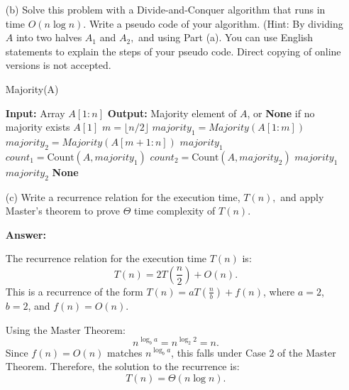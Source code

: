\documentclass[12pt]{article}
\begin{document}
\begin{itemize}
\begin{proof}
\end{proof}

\newpage
\item[(b)]  Solve this problem with a Divide-and-Conquer algorithm that runs in time $O(n \log n). $ Write a pseudo code of your algorithm.   (Hint: By dividing $A$ into two halves $A_1$ and $A_2,$ and using Part (a). You can use English statements to explain the steps of your pseudo code. Direct copying of online versions is not accepted.

\begin{algorithm}
\caption{Majority(A)}
\begin{algorithmic}[1]
\State \textbf{Input:} Array $A[1 : n]$
\State \textbf{Output:} Majority element of $A$, or \textbf{None} if no majority exists
\State
{} 
    \State \Return $A[1]$ 
\EndIf
\State
\State $m = \lfloor n/2 \rfloor$ 
\State $majority_1 = Majority(A[1 : m])$ 
\State $majority_2 = Majority(A[m+1 : n])$ 
\State
{} 
    \State \Return $majority_1$ 
\EndIf
\State
\State $count_1 = \text{Count}(A, majority_1)$ 
\State $count_2 = \text{Count}(A, majority_2)$ 
\State
{} 
    \State \Return $majority_1$ 
    \State \Return $majority_2$ 
\Else 
    \State \Return \textbf{None} 
\EndIf
\end{algorithmic}
\end{algorithm}

\item[(c)]Write a recurrence relation for the execution time, $T(n),$ and apply Master's theorem to prove $\Theta$ time complexity of $T(n)$.

{\bf Answer:}

The recurrence relation for the execution time $T(n)$ is:
\[
T(n) = 2T\left(\frac{n}{2}\right) + O(n).
\]
This is a recurrence of the form $T(n) = aT\left(\frac{n}{b}\right) + f(n)$, where $a = 2$, $b = 2$, and $f(n) = O(n)$.

Using the Master Theorem:
\[
n^{\log_b a} = n^{\log_2 2} = n.
\]
Since $f(n) = O(n)$ matches $n^{\log_b a}$, this falls under Case 2 of the Master Theorem. Therefore, the solution to the recurrence is:
\[
T(n) = \Theta(n \log n).
\]


\end{itemize}
\end{document}
